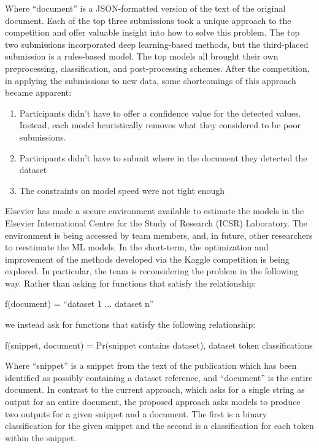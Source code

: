 \documentclass[titlepage, 11pt]{article}
\begin{document}
{Where “document” is a JSON-formatted version of the text of the original document. Each of the top three submissions took a unique approach to the competition and offer valuable insight into how to solve this problem. The top two submissions incorporated deep learning-based methods, but the third-placed submission is a rules-based model. The top models all brought their own preprocessing, classification, and post-processing schemes. After the competition, in applying the submissions to new data, some shortcomings of this approach became apparent:

\begin{enumerate}[label=\arabic*.]
\item Participants didn’t have to offer a confidence value for the detected values. Instead, each model heuristically removes what they considered to be poor submissions.
\item Participants didn’t have to submit where in the document they detected the dataset
\item The constraints on model speed were not tight enough

\end{enumerate}

Elsevier has made a secure environment available to estimate the models in the Elsevier International Centre for the Study of Research (ICSR) Laboratory. The environment is being accessed by team members, and, in future, other researchers to reestimate the ML models. In the short-term, the optimization and improvement of the methods developed via the Kaggle competition is being explored.  In particular, the team is reconsidering the problem in the following way. Rather than asking for functions that satisfy the relationship:

f(document) = “dataset 1\textbar\hspace{1pt} ... \textbar\hspace{1pt} dataset n”

we instead ask for functions that satisfy the following relationship:

f(snippet, document) = Pr(snippet contains dataset), dataset token classifications

Where “snippet” is a snippet from the text of the publication which has been identified as possibly containing a dataset reference, and “document” is the entire document. In contrast to the current approach, which asks for a single string as output for an entire document, the proposed approach asks models to produce two outputs for a given snippet and a document. The first is a binary classification for the given snippet and the second is a classification for each token within the snippet.

}
\end{document}
